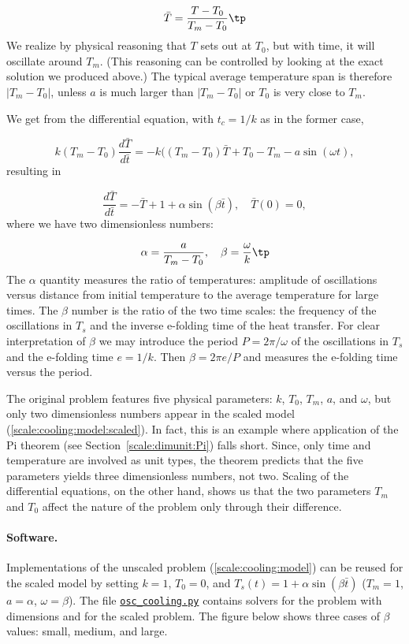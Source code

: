 \documentclass[graybox,envcountchap,sectrefs,final]{svmonodo}
\newenvironment{notice_mdfboxadmon}[1][]{
\begin{notice_mdfboxmdframed}[frametitle=#1]
}
{
\end{notice_mdfboxmdframed}
}
\begin{document}
\[ \bar T = \frac{T-T_0}{T_m-T_0}\tp\]
We realize by physical
reasoning that $T$ sets out at $T_0$, but with time, it will oscillate
around $T_m$. (This reasoning can be controlled by looking at the exact
solution we produced above.)
The typical average temperature span is therefore
$|T_m-T_0|$, unless $a$ is much larger than $|T_m-T_0|$ or $T_0$ is
very close to
$T_m$.

We get from the differential equation, with $t_c=1/k$ as in the former
case,

\[ k(T_m-T_0)\frac{d\bar T}{d\bar t} = -k((T_m-T_0)\bar T + T_0 - T_m - a
\sin(\omega t),\]
resulting in

\begin{equation}
\frac{d\bar T}{d\bar t} = -\bar T + 1 + \alpha\sin (\beta \bar t),\quad
\bar T(0)=0,
\label{scale:cooling:model:scaled}
\end{equation}
where we have two dimensionless numbers:

\[ \alpha = \frac{a}{T_m-T_0},\quad \beta = \frac{\omega}{k}\tp\]
The $\alpha$ quantity measures the ratio of temperatures: amplitude of
oscillations versus distance from initial temperature to the average
temperature for large times.  The $\beta$ number is the ratio of the
two time scales: the frequency of the oscillations in $T_s$ and the
inverse e-folding time of the heat transfer. For clear interpretation
of $\beta$ we may introduce the period $P=2\pi/\omega$ of the
oscillations in $T_s$ and the e-folding time $e=1/k$. Then $\beta =
2\pi e/P$ and measures the e-folding time versus the period.


\begin{notice_mdfboxadmon}[Remark]
The original problem features five physical parameters: $k$, $T_0$,
$T_m$, $a$, and $\omega$, but only two dimensionless numbers appear in the
scaled model (\ref{scale:cooling:model:scaled}).
In fact, this is an example where application of the Pi theorem
(see Section~\ref{scale:dimunit:Pi}) falls
short. Since, only time and temperature are involved as unit types, the
theorem predicts that the five parameters yields three dimensionless numbers,
not two. Scaling of the differential equations, on the other hand,
shows us that the two parameters
$T_m$ and $T_0$ affect the nature of the problem only through their difference.
\end{notice_mdfboxadmon}



\paragraph{Software.}
Implementations of the unscaled problem (\ref{scale:cooling:model})
can be reused for the scaled model by setting $k=1$, $T_0=0$, and
$T_s(t) = 1 + \alpha\sin (\beta \bar t)$ ($T_m=1$, $a=\alpha$, $\omega =\beta$).
The file \href{{http://tinyurl.com/o8pb3yy/osc_cooling.py}}{\nolinkurl{osc_cooling.py}} contains
solvers for the problem with dimensions and
for the scaled problem. The figure below
shows three cases of $\beta$ values: small, medium, and large.
\end{document}
